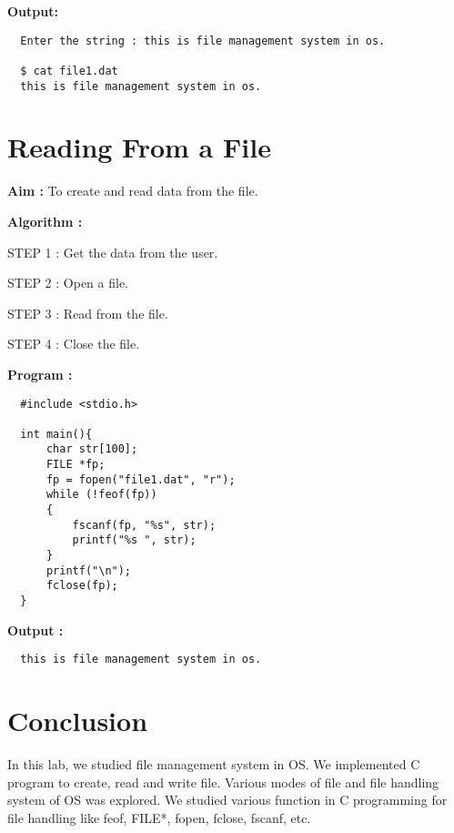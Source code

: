 \documentclass[journal,onecolumn]{IEEEtran}
\begin{document}
\textbf{Output:}
\begin{verbatim}
  Enter the string : this is file management system in os.

  $ cat file1.dat 
  this is file management system in os.
\end{verbatim}

\section{Reading From a File}
\textbf{Aim :} To create and read data from the file.

\textbf{Algorithm :}
\begin{list}{}{}
  \item STEP 1 : Get the data from the user.
  \item STEP 2 : Open a file.
  \item STEP 3 : Read from the file. 
  \item STEP 4 : Close the file.
\end{list}


\textbf{Program :}
\begin{verbatim}
  #include <stdio.h>

  int main(){
      char str[100];
      FILE *fp;
      fp = fopen("file1.dat", "r");
      while (!feof(fp))
      {
          fscanf(fp, "%s", str);
          printf("%s ", str);
      }
      printf("\n");
      fclose(fp);
  }
\end{verbatim}

\textbf{Output :}
\begin{verbatim}
  this is file management system in os.
\end{verbatim}




\section{Conclusion}
In this lab, we studied file management system in OS. We implemented C program to create, read and write file. Various modes of file and file handling system of OS was explored. We studied various function in C programming for file handling like feof, FILE*, fopen, fclose, fscanf, etc.
\end{document}
